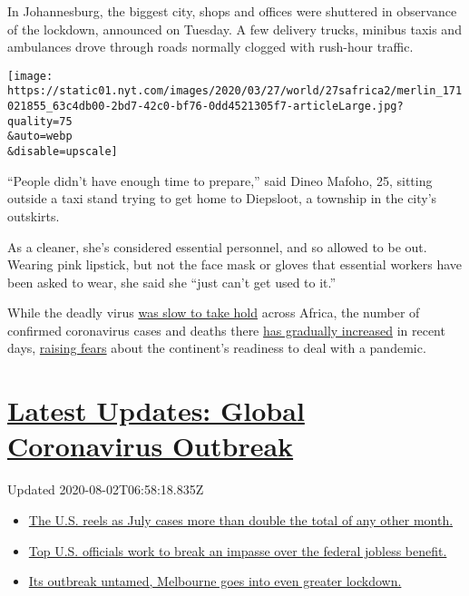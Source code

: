 In Johannesburg, the biggest city, shops and offices were shuttered in
observance of the lockdown, announced on Tuesday. A few delivery trucks,
minibus taxis and ambulances drove through roads normally clogged with
rush-hour traffic.

\texttt{[image: https://static01.nyt.com/images/2020/03/27/world/27safrica2/merlin\_171021855\_63c4db00-2bd7-42c0-bf76-0dd4521305f7-articleLarge.jpg?quality=75\\\&auto=webp\\\&disable=upscale]}

``People didn't have enough time to prepare,'' said Dineo Mafoho, 25,
sitting outside a taxi stand trying to get home to Diepsloot, a township
in the city's outskirts.

As a cleaner, she's considered essential personnel, and so allowed to be
out. Wearing pink lipstick, but not the face mask or gloves that
essential workers have been asked to wear, she said she ``just can't get
used to it.''

While the deadly virus
\href{https://www.nytimes.com/2020/02/06/world/africa/africa-coronavirus-china.html}{was
slow to take hold} across Africa, the number of confirmed coronavirus
cases and deaths there
\href{https://www.nytimes.com/2020/02/28/world/africa/nigeria-coronavirus.html}{has
gradually increased} in recent days,
\href{https://www.nytimes.com/2020/03/17/world/africa/coronavirus-africa-burkina-faso.html}{raising
fears} about the continent's readiness to deal with a pandemic.

\hypertarget{latest-updates-global-coronavirus-outbreak}{%
\section{\texorpdfstring{\href{https://www.nytimes.com/2020/08/01/world/coronavirus-covid-19.html?action=click\&pgtype=Article\&state=default\&region=MAIN_CONTENT_1\&context=storylines_live_updates}{Latest
Updates: Global Coronavirus
Outbreak}}{Latest Updates: Global Coronavirus Outbreak}}\label{latest-updates-global-coronavirus-outbreak}}

Updated 2020-08-02T06:58:18.835Z

\begin{itemize}
\tightlist
\item
  \href{https://www.nytimes.com/2020/08/01/world/coronavirus-covid-19.html?action=click\&pgtype=Article\&state=default\&region=MAIN_CONTENT_1\&context=storylines_live_updates\#link-34047410}{The
  U.S. reels as July cases more than double the total of any other
  month.}
\item
  \href{https://www.nytimes.com/2020/08/01/world/coronavirus-covid-19.html?action=click\&pgtype=Article\&state=default\&region=MAIN_CONTENT_1\&context=storylines_live_updates\#link-780ec966}{Top
  U.S. officials work to break an impasse over the federal jobless
  benefit.}
\item
  \href{https://www.nytimes.com/2020/08/01/world/coronavirus-covid-19.html?action=click\&pgtype=Article\&state=default\&region=MAIN_CONTENT_1\&context=storylines_live_updates\#link-2bc8948}{Its
  outbreak untamed, Melbourne goes into even greater lockdown.}
\end{itemize}

